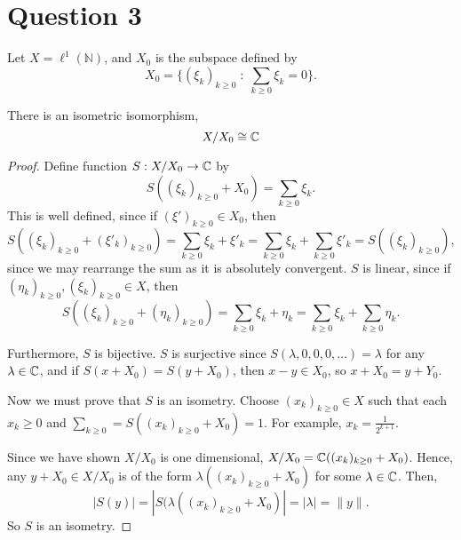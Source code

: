 \documentclass{unswmaths}
\begin{document}
\section*{Question 3}
Let $X = \ell^1(\mathbb{N})$, and $X_0$ is the subspace defined by
\begin{equation*}
    X_0 = \{ (\xi_k)_{k\geq 0} \;:\;\sum_{k\geq 0} \xi_k = 0\}.
\end{equation*}
\begin{theorem}
    There is an isometric isomorphism,
    \begin{equation*}
        X/X_0 \cong \mathbb{C}
    \end{equation*}
\end{theorem}
\begin{proof}
    Define function $S:X/X_0\rightarrow \mathbb{C}$ by
    \begin{equation*}
        S((\xi_k)_{k\geq 0}+X_0) = \sum_{k\geq 0} \xi_k.
    \end{equation*}
    This is well defined, since if $(\xi')_{k\geq 0} \in X_0$, then 
    \begin{equation*}
        S((\xi_k)_{k\geq 0}+(\xi'_k)_{k\geq 0}) = \sum_{k\geq 0} \xi_k+\xi'_k = \sum_{k\geq 0}\xi_k + \sum_{k\geq 0}\xi'_k = S((\xi_k)_{k\geq 0}),
    \end{equation*}
    since we may rearrange the sum as it is absolutely convergent. $S$ is linear, since if $(\eta_k)_{k\geq0},(\xi_k)_{k\geq0} \in X$, then
    \begin{equation*}
        S((\xi_k)_{k\geq 0}+(\eta_k)_{k\geq 0}) = \sum_{k\geq 0} \xi_k+\eta_k = \sum_{k\geq 0}\xi_k + \sum_{k\geq 0} \eta_k.
    \end{equation*}
    
    Furthermore, $S$ is bijective. $S$ is surjective since $S(\lambda,0,0,0,\ldots) = \lambda$ for any $\lambda \in \mathbb{C}$,
    and if $S(x+X_0) = S(y+X_0)$, then $x-y \in X_0$, so $x+X_0 = y+Y_0$. 
    
    Now we must prove that $S$ is an isometry. Choose $(x_k)_{k\geq 0} \in X$ such that each $x_k \geq 0$
    and $\sum_{k\geq 0} = S((x_k)_{k\geq 0}+X_0) = 1$. For example, $x_k = \frac{1}{2^{k+1}}$.
    
    
    Since we have shown $X/X_0$ is one dimensional, $X/X_0 = \mathbb{C}((x_k)_{k\geq 0}+X_0)$. Hence, any $y + X_0 \in X/X_0$
    is of the form $\lambda((x_k)_{k\geq 0}+X_0)$ for some $\lambda \in \mathbb{C}$. Then,
    \begin{equation*}
        |S(y)| = |S(\lambda((x_k)_{k\geq 0}+X_0)| = |\lambda| = \|y\|.
    \end{equation*}
    So $S$ is an isometry.
\end{proof}
\end{document}
